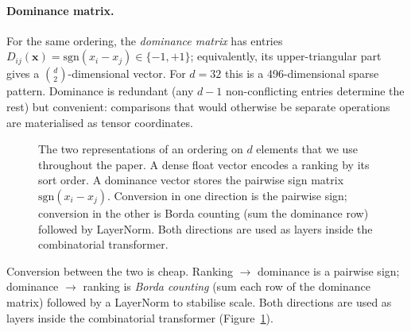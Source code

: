 \documentclass[11pt]{article}
\begin{document}
\paragraph{Dominance matrix.}
For the same ordering, the \emph{dominance matrix} has entries $D_{ij}(\mathbf{x}) = \mathrm{sgn}(x_i - x_j) \in \{-1, +1\}$; equivalently, its upper-triangular part gives a $\binom{d}{2}$-dimensional vector.
For $d = 32$ this is a 496-dimensional sparse pattern.
Dominance is redundant (any $d - 1$ non-conflicting entries determine the rest) but convenient: comparisons that would otherwise be separate operations are materialised as tensor coordinates.

\begin{figure}[!t]
\centering
{}
\caption{The two representations of an ordering on $d$ elements that we use throughout the paper. A dense float vector encodes a ranking by its sort order. A dominance vector stores the pairwise sign matrix $\mathrm{sgn}(x_i - x_j)$. Conversion in one direction is the pairwise sign; conversion in the other is Borda counting (sum the dominance row) followed by LayerNorm. Both directions are used as layers inside the combinatorial transformer.}
\label{fig:representations}
\end{figure}

Conversion between the two is cheap.
Ranking $\to$ dominance is a pairwise sign; dominance $\to$ ranking is \emph{Borda counting} (sum each row of the dominance matrix) followed by a LayerNorm to stabilise scale.
Both directions are used as layers inside the combinatorial transformer (Figure~\ref{fig:representations}).
\end{document}
